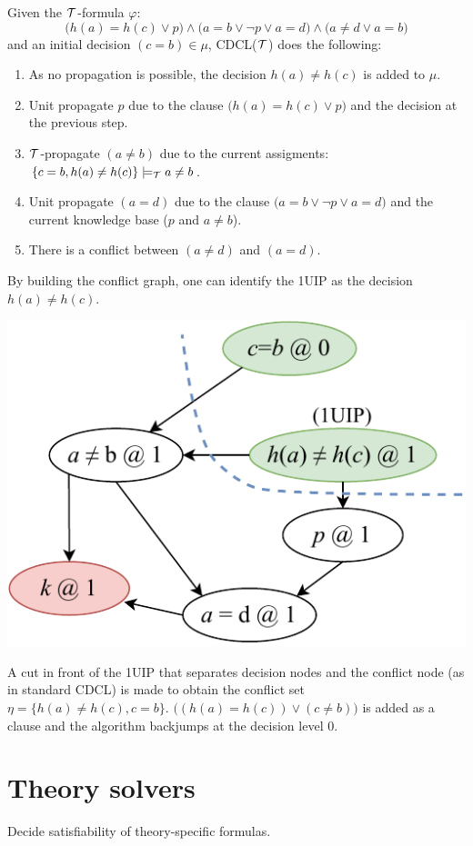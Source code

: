 \begin{example}
    Given the $\mathcal{T}$-formula $\varphi$:
    \[ \big( h(a) = h(c) \vee p \big) \land \big( a = b \vee \lnot p \vee a = d \big) \land \big( a \neq d \vee a = b \big) \]
    and an initial decision $(c = b) \in \mu$,
    CDCL($\mathcal{T}$) does the following:
    \begin{enumerate}
        \item As no propagation is possible, the decision $h(a) \neq h(c)$ is added to $\mu$.
        \item Unit propagate $p$ due to the clause $\big( h(a) = h(c) \vee p \big)$ and the decision at the previous step.
        \item $\mathcal{T}$-propagate $(a \neq b)$ due to the current assigments: $\{ c = b, h(a) \neq h(c) \} \models_{\mathcal{T}} a \neq b$.
        \item Unit propagate $(a = d)$ due to the clause $\big( a = b \vee \lnot p \vee a = d \big)$ and the current knowledge base ($p$ and $a \neq b$).
        \item There is a conflict between $(a \neq d)$ and $(a = d)$.
    \end{enumerate}

    By building the conflict graph, one can identify the 1UIP as the decision $h(a) \neq h(c)$.
    \begin{center}
        \includegraphics[width=0.35\linewidth]{./img/_conflict_graph_example.pdf}
    \end{center}
    A cut in front of the 1UIP that separates decision nodes and the conflict node (as in standard CDCL) is made
    to obtain the conflict set $\eta = \{ h(a) \neq h(c), c = b \}$.
    $\big( (h(a) = h(c)) \vee (c \neq b) \big)$ is added as a clause and the algorithm backjumps at the decision level 0.
\end{example}



\section{Theory solvers}

Decide satisfiability of theory-specific formulas.

